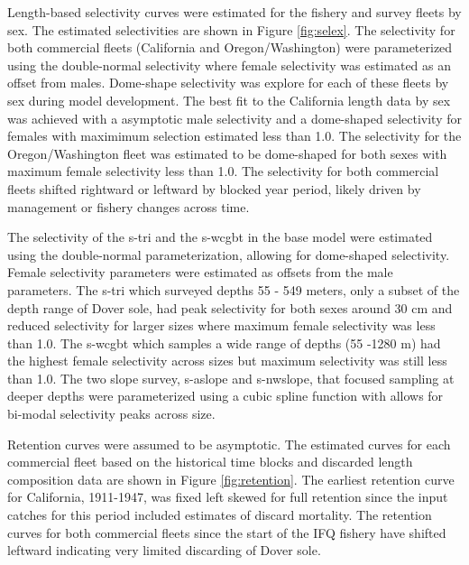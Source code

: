 \documentclass[11pt,
  english,
  a4paper,
]{article}
\begin{document}
\leavevmode\tagmcend\tagstructend\par


Length-based selectivity curves were estimated for the fishery and survey fleets by sex. The estimated selectivities are shown in Figure \ref{fig:selex}. The selectivity for both commercial fleets (California and Oregon/Washington) were parameterized using the double-normal selectivity where female selectivity was estimated as an offset from males. Dome-shape selectivity was explore for each of these fleets by sex during model development. The best fit to the California length data by sex was achieved with a asymptotic male selectivity and a dome-shaped selectivity for females with maximimum selection estimated less than 1.0. The selectivity for the Oregon/Washington fleet was estimated to be dome-shaped for both sexes with maximum female selectivity less than 1.0. The selectivity for both commercial fleets shifted rightward or leftward by blocked year period, likely driven by management or fishery changes across time.

\leavevmode\tagmcend\tagstructend\par


The selectivity of the \gls{s-tri} and the \gls{s-wcgbt} in the base model were estimated using the double-normal parameterization, allowing for dome-shaped selectivity. Female selectivity parameters were estimated as offsets from the male parameters. The \gls{s-tri} which surveyed depths 55 - 549 meters, only a subset of the depth range of Dover sole, had peak selectivity for both sexes around 30 cm and reduced selectivity for larger sizes where maximum female selectivity was less than 1.0. The \gls{s-wcgbt} which samples a wide range of depths (55 -1280 m) had the highest female selectivity across sizes but maximum selectivity was still less than 1.0. The two slope survey, \gls{s-aslope} and \gls{s-nwslope}, that focused sampling at deeper depths were parameterized using a cubic spline function with allows for bi-modal selectivity peaks across size.

\leavevmode\tagmcend\tagstructend\par


Retention curves were assumed to be asymptotic. The estimated curves for each commercial fleet based on the historical time blocks and discarded length composition data are shown in Figure \ref{fig:retention}. The earliest retention curve for California, 1911-1947, was fixed left skewed for full retention since the input catches for this period included estimates of discard mortality. The retention curves for both commercial fleets since the start of the IFQ fishery have shifted leftward indicating very limited discarding of Dover sole.
\end{document}
